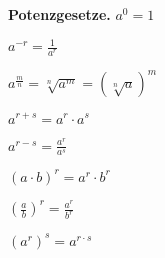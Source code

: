 \textbf{Potenzgesetze.} $a^{0}=1$

$a^{-r}=\frac{1}{a^{r}}$

$a^{\frac{m}{n}}=\sqrt[n]{a^{m}}=\left(\sqrt[n]{a}\right)^{m}$

$a^{r+s}=a^{r}\cdot a^{s}$

$a^{r-s}=\frac{a^{r}}{a^{s}}$

$(a\cdot b)^{r}=a^{r}\cdot b^{r}$

$\left(\frac{a}{b}\right)^{r}=\frac{a^{r}}{b^{r}}$

$\left(a^{r}\right)^{s}=a^{r\cdot s}$

